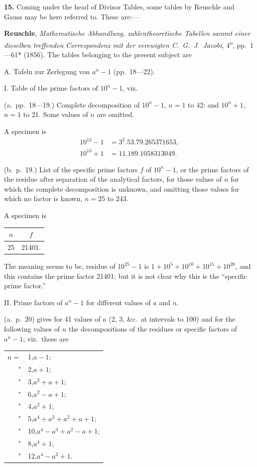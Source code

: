 \documentclass[11pt,a4paper]{article}
\begin{document}
\textbf{15.} Coming under the head of Divisor Tables, some tables by Reuschle and Gauss may be here referred to. These are:---

\quad\textbf{Reuschle}, \textit{Mathematische Abhandlung, zahlentheoretische Tabellen sammt einer dieselben treffenden Correspondenz mit der verewigten C.\ G.\ J.\ Jacobi}, 4\textsuperscript{o}, pp.\ 1---61* (1856). The tables belonging to the present subject are

A. Tafeln zur Zerlegung von $a^{n}-1$ (pp.\ 18---22).

I. Table of the prime factors of $10^{n}-1$, viz.

(a.\ pp.\ 18---19.) Complete decomposition of $10^{n}-1$, $n=1$ to 42: and $10^{n}+1$, $n=1$ to 21. Some values of $n$ are omitted.

A specimen is
\begin{align*}
10^{13}-1 &= 3^{2}.53.79.265371653,\\
10^{13}+1 &= 11.189.1058313049.
\end{align*}

(b.\ p.\ 19.) List of the specific prime factors $f$ of $10^{n}-1$, or the prime factors of the residue after separation of the analytical factors, for those values of $n$ for which the complete decomposition is unknown, and omitting those values for which no factor is known, $n = 25$ to 243.

A specimen is
\begin{center}
\begin{tabular}{c|c}
$n$ & $f$ \\
\hline
25 & 21401.
\end{tabular}
\end{center}

The meaning seems to be, residue of $10^{25}-1$ is $1+10^{5}+10^{10}+10^{15}+10^{20}$, and this contains the prime factor 21401; but it is not clear why this is the ``specific prime factor.''

II. Prime factors of $a^{n}-1$ for different values of $a$ and $n$.

(a.\ p.\ 20) gives for 41 values of $a$ (2, 3, \&c.\ at intervals to 100) and for the following values of $n$ the decompositions of the residues or specific factors of $a^{n}-1$; viz.\ these are
\begin{center}
\begin{tabular}{r@{\quad}l}
$n=$ & 1,\quad $a-1$; \\
" & 2,\quad $a+1$; \\
" & 3,\quad $a^{2}+a+1$; \\
" & 6,\quad $a^{2}-a+1$; \\
" & 4,\quad $a^{2}+1$; \\
" & 5,\quad $a^{4}+a^{3}+a^{2}+a+1$; \\
" & 10,\quad $a^{4}-a^{3}+a^{2}-a+1$; \\
" & 8,\quad $a^{4}+1$; \\
" & 12,\quad $a^{4}-a^{2}+1$. \\
\end{tabular}
\end{center}
\end{document}
